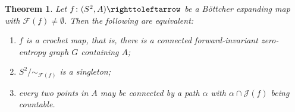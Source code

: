 \documentclass{amsart}
\theoremstyle{plain}
\newtheorem{theorem}{Theorem}[section]
\theoremstyle{definition}
\theoremstyle{remark}
\newcommand{\Fat}{{\mathcal F}}
\newcommand{\Jul}{{\mathcal J}}
\newcommand\selfmap{\righttoleftarrow}
\begin{document}
\begin{theorem}
\label{thm:crochet}
Let $f\colon(S^2,A)\selfmap$  be a B\"ottcher expanding map with $\Fat(f)\not=\emptyset$. Then the following are equivalent:
\begin{enumerate}[label=\text{(\roman*)},font=\normalfont,leftmargin=*]
\item $f$ is a crochet map, that is,  there is a connected forward-invariant zero-entropy graph $G$ containing $A$; 
\item $S^2/\sim_{\Fat(f)}$ is a singleton;
\item every two points in $A$ may be connected by a path $\alpha$ with $\alpha\cap \Jul(f)$ being countable. 
\end{enumerate}
\end{theorem}
\end{document}

